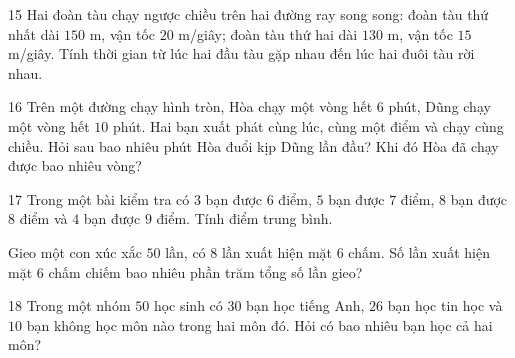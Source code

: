 \gap
\begin{probbox}{15}{\relax}
Hai đoàn tàu chạy ngược chiều trên hai đường ray song song: đoàn tàu thứ nhất dài $150$ m, vận tốc $20$ m/giây; đoàn tàu thứ hai dài $130$ m, vận tốc $15$ m/giây. Tính thời gian từ lúc hai đầu tàu gặp nhau đến lúc hai đuôi tàu rời nhau.
\end{probbox}
\gap
\begin{probbox}{16}{}
Trên một đường chạy hình tròn, Hòa chạy một vòng hết $6$ phút, Dũng chạy một vòng hết $10$ phút. Hai bạn xuất phát cùng lúc, cùng một điểm và chạy cùng chiều. Hỏi sau bao nhiêu phút Hòa đuổi kịp Dũng lần đầu? Khi đó Hòa đã chạy được bao nhiêu vòng?
\end{probbox}
\gap
\begin{probbox}{17}{\relax}
 Trong một bài kiểm tra có $3$ bạn được $6$ điểm, $5$ bạn được $7$ điểm, $8$ bạn được $8$ điểm và $4$ bạn được $9$ điểm. Tính điểm trung bình.\par
{} Gieo một con xúc xắc $50$ lần, có $8$ lần xuất hiện mặt $6$ chấm. Số lần xuất hiện mặt $6$ chấm chiếm bao nhiêu phần trăm tổng số lần gieo?
\end{probbox}
\gap
\begin{probbox}{18}{\relax}
Trong một nhóm $50$ học sinh có $30$ bạn học tiếng Anh, $26$ bạn học tin học và $10$ bạn không học môn nào trong hai môn đó. Hỏi có bao nhiêu bạn học cả hai môn?
\end{probbox}
\gap
